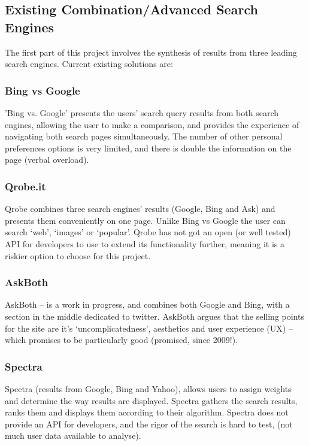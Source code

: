 \documentclass[10pt]{article}
\begin{document}
\subsection{Existing Combination/Advanced Search Engines}\label{Existing Combination/Advanced Search Engines}
The first part of this project involves the synthesis of results from three leading search engines. Current existing solutions are: 

\subsubsection{Bing vs Google}
'Bing vs. Google' presents the users’ search query results from both search engines, allowing the user to make a comparison, and provides the experience of navigating both search pages simultaneously.  
The number of other personal preferences options is very limited, and there is double the information on the page (verbal overload).

\subsubsection{Qrobe.it}
Qrobe combines three search engines’ results (Google, Bing and Ask) and presents them conveniently on one page. Unlike Bing vs Google the user can search ‘web’, ‘images’ or ‘popular’. Qrobe has not got an open (or well tested) API for developers to use to extend its functionality further, meaning it is a riskier option to choose for this project.

\subsubsection{AskBoth}
AskBoth – is a work in progress, and combines both Google and Bing, with a section in the middle dedicated to twitter. AskBoth argues that the selling points for the site are it’s ‘uncomplicatedness’, aesthetics and user experience (UX) – which promises to be particularly good (promised, since 2009!).

\subsubsection{Spectra}
Spectra (results from Google, Bing and Yahoo), allows users to assign weights and determine the way results are displayed. Spectra gathers the search results, ranks them and displays them according to their algorithm. Spectra does not provide an API for developers, and the rigor of the search is hard to test, (not much user data available to analyse).
\end{document}
